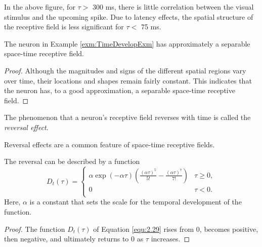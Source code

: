 \begin{rem}
  In the above figure, for $\tau >$ 300 ms, there is little correlation between the visual stimulus and the upcoming spike. Due to latency effects, the spatial structure of the receptive field is less significant for $\tau <$ 75 ms.
\end{rem}

\begin{prop}
   The neuron in Example \ref{exm:TimeDevelopExm} has approximately a separable space-time receptive field.
\end{prop}
\begin{proof}
  Although the magnitudes and signs of the different spatial regions vary over time, their locations and shapes remain fairly constant. This indicates that the neuron has, to a good approximation, a separable space-time receptive field.
\end{proof}

\begin{defn}
  The phenomenon that a neuron's receptive field reverses with time is called the \emph{reversal effect}.
\end{defn}

\begin{rem}
  Reversal effects are a common feature of space-time receptive fields.
\end{rem}

\begin{prop}
  \label{prop:twoPhaseReact}
  The reversal can be described by a function
  \begin{equation}
    \label{equ:2.29}
    D_t(\tau) = \left\{
      \begin{array}{ll}
        \alpha \exp(-\alpha\tau)\left(\frac{(\alpha\tau)^5}{5!} - \frac{(\alpha\tau)^7}{7!}\right) & \tau \geq 0,\\
        0 & \tau < 0.\\
      \end{array} \right.
  \end{equation}
  Here, $\alpha$ is a constant that sets the scale for the temporal development of the function.
\end{prop}
\begin{proof}
  The function $D_t(\tau)$ of Equation \ref{equ:2.29} rises from 0, becomes positive, then negative, and ultimately returns to 0 as $\tau$ increases.
\end{proof}

